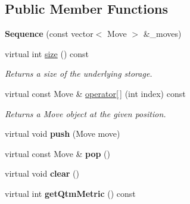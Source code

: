 \subsection*{Public Member Functions}
\begin{CompactItemize}
\item 
\hypertarget{classBrutha_1_1Sequence_642c0d4d05d18ece53275f58b7120a18}{
\textbf{Sequence} (const vector$<$ Move $>$ \&\_\-moves)}
\label{classBrutha_1_1Sequence_642c0d4d05d18ece53275f58b7120a18}

\item 
virtual int \hyperlink{classBrutha_1_1Sequence_9e2aa4c6db6063aff5247f2cd5e7b7df}{size} () const 
\begin{CompactList}\small\item\em Returns a size of the underlying storage. \item\end{CompactList}\item 
\hypertarget{classBrutha_1_1Sequence_830bc00f3067f33664f91d519eeb80f2}{
virtual const Move \& \hyperlink{classBrutha_1_1Sequence_830bc00f3067f33664f91d519eeb80f2}{operator\mbox{[}$\,$\mbox{]}} (int index) const }
\label{classBrutha_1_1Sequence_830bc00f3067f33664f91d519eeb80f2}

\begin{CompactList}\small\item\em Returns a Move object at the given position. \item\end{CompactList}\item 
\hypertarget{classBrutha_1_1Sequence_33967587aa561719e322594d2247f63f}{
virtual void \textbf{push} (Move move)}
\label{classBrutha_1_1Sequence_33967587aa561719e322594d2247f63f}

\item 
\hypertarget{classBrutha_1_1Sequence_5e86148bf39752cef9054ecd7354d9d0}{
virtual const Move \& \textbf{pop} ()}
\label{classBrutha_1_1Sequence_5e86148bf39752cef9054ecd7354d9d0}

\item 
\hypertarget{classBrutha_1_1Sequence_599b970cf400ee90b250ea9b578af8f4}{
virtual void \textbf{clear} ()}
\label{classBrutha_1_1Sequence_599b970cf400ee90b250ea9b578af8f4}

\item 
\hypertarget{classBrutha_1_1Sequence_43951830faef8f02b8eff4b0eaabd0b8}{
virtual int \textbf{getQtmMetric} () const }
\label{classBrutha_1_1Sequence_43951830faef8f02b8eff4b0eaabd0b8}


\end{CompactItemize}
